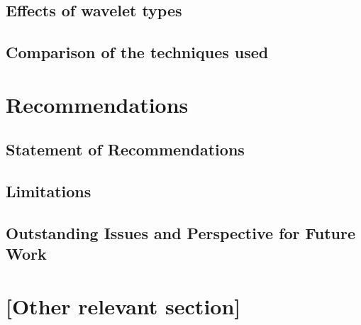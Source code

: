 \documentclass[11pt]{scrartcl}
\begin{document}
\subsection{Effects of wavelet types}
\label{sec:effects-wavel-types}



\subsection{Comparison of the techniques used}
\label{sec:comp-techn-used}



\section{Recommendations}


\subsection{Statement of Recommendations}


\subsection{Limitations}


\subsection{Outstanding Issues and Perspective for Future Work}




\section{[Other relevant section]}








\end{document}
